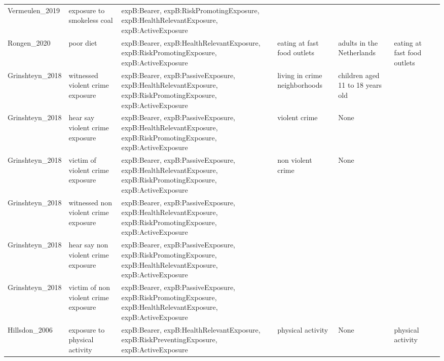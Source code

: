 \begin{tabular}{p{1cm}p{1cm}p{1cm}p{1cm}p{1cm}p{1cm}p{1cm}}
Vermeulen\_2019 & exposure to smokeless coal & expB:Bearer, expB:RiskPromotingExposure, expB:HealthRelevantExposure, expB:ActiveExposure &  &  &  &  \\
Rongen\_2020 & poor diet & expB:Bearer, expB:HealthRelevantExposure, expB:RiskPromotingExposure, expB:ActiveExposure & eating at fast food outlets & adults in the Netherlands & eating at fast food outlets &  \\
Grinshteyn\_2018 & witnessed violent crime exposure & expB:Bearer, expB:PassiveExposure, expB:HealthRelevantExposure, expB:RiskPromotingExposure, expB:ActiveExposure & living in crime neighborhoods & children aged 11 to 18 years old &  &  \\
Grinshteyn\_2018 & hear say violent crime exposure & expB:Bearer, expB:PassiveExposure, expB:HealthRelevantExposure, expB:RiskPromotingExposure, expB:ActiveExposure & violent crime & None &  &  \\
Grinshteyn\_2018 & victim of violent crime exposure & expB:Bearer, expB:PassiveExposure, expB:HealthRelevantExposure, expB:RiskPromotingExposure, expB:ActiveExposure & non violent crime & None &  &  \\
Grinshteyn\_2018 & witnessed non violent crime exposure & expB:Bearer, expB:PassiveExposure, expB:HealthRelevantExposure, expB:RiskPromotingExposure, expB:ActiveExposure &  &  &  &  \\
Grinshteyn\_2018 & hear say non violent crime exposure & expB:Bearer, expB:PassiveExposure, expB:RiskPromotingExposure, expB:HealthRelevantExposure, expB:ActiveExposure &  &  &  &  \\
Grinshteyn\_2018 & victim of non violent crime exposure & expB:Bearer, expB:PassiveExposure, expB:RiskPromotingExposure, expB:HealthRelevantExposure, expB:ActiveExposure &  &  &  &  \\
Hillsdon\_2006 & exposure to physical activity & expB:Bearer, expB:HealthRelevantExposure, expB:RiskPreventingExposure, expB:ActiveExposure & physical activity & None & physical activity &  \\
\bottomrule
\end{tabular}
